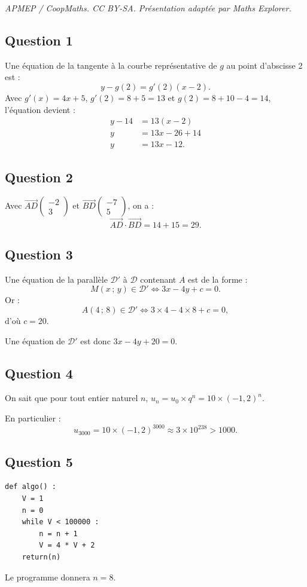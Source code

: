 \documentclass[10pt]{article}
\begin{document}
\noindent\textit{APMEP / CoopMaths. CC BY-SA. Présentation adaptée par Maths Explorer.}\par\medskip
\subsection*{Question 1}

Une équation de la tangente à la courbe représentative de \(g\) au point d'abscisse 2 est :
\[
y - g(2) = g'(2)(x - 2).
\]
Avec \(g'(x) = 4x + 5\), \(g'(2) = 8 + 5 = 13\) et \(g(2) = 8 + 10 - 4 = 14\), l'équation devient :
\begin{align*}
y - 14 &= 13(x - 2) \\
y &= 13x - 26 + 14 \\
y &= 13x - 12.
\end{align*}

\subsection*{Question 2}

Avec \(\overrightarrow{AD} \begin{pmatrix} -2 \\ 3 \end{pmatrix}\) et \(\overrightarrow{BD} \begin{pmatrix} -7 \\ 5 \end{pmatrix}\), on a :
\[
\overrightarrow{AD} \cdot \overrightarrow{BD} = 14 + 15 = 29.
\]

\subsection*{Question 3}

Une équation de la parallèle \( \mathcal{D}' \) à \( \mathcal{D} \) contenant \( A \) est de la forme :
\[
M(x\,;\,y) \in \mathcal{D}' \iff 3x - 4y + c = 0.
\]
Or :
\[
A(4\,;\,8) \in \mathcal{D}' \iff 3 \times 4 - 4 \times 8 + c = 0,
\]
d'où  \(c = 20\).

Une équation de \( \mathcal{D}' \) est donc \( 3x - 4y + 20 = 0 \).

\subsection*{Question 4}

On sait que pour tout entier naturel \( n \), \( u_n = u_0 \times q^n = 10 \times (-1{,}2)^n \).

En particulier :
\[
u_{3000} = 10 \times (-1{,}2)^{3000} \approx 3 \times 10^{238} > 1000.
\]

\subsection*{Question 5}

\begin{center}
\begin{lstlisting}[style=python]
def algo() :
    V = 1
    n = 0
    while V < 100000 :
        n = n + 1
        V = 4 * V + 2
    return(n)
\end{lstlisting}
\end{center}
Le programme donnera \( n = 8 \).
\end{document}
